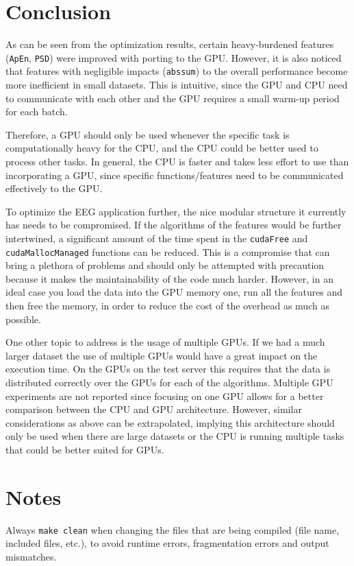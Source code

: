 \documentclass[a4paper]{article}
\begin{document}
\section{Conclusion}

As can be seen from the optimization results, certain heavy-burdened features (\texttt{ApEn}, \texttt{PSD}) were improved with porting to the GPU. However, it is also noticed that features with negligible impacts (\texttt{abssum}) to the overall performance become more inefficient in small datasets. This is intuitive, since the GPU and CPU need to communicate with each other and the GPU requires a small warm-up period for each batch. 

Therefore, a GPU should only be used whenever the specific task is computationally heavy for the CPU, and the CPU could be better used to process other tasks. In general, the CPU is faster and takes less effort to use than incorporating a GPU, since specific functions/features need to be communicated effectively to the GPU.

To optimize the EEG application further, the nice modular structure it currently has needs to be compromised. If the algorithms of the features would be further intertwined, a significant amount of the time spent in the \texttt{cudaFree} and \texttt{cudaMallocManaged} functions can be reduced. This is a compromise that can bring a plethora of problems and should only be attempted with precaution because it makes the maintainability of the code much harder. However, in an ideal case you load the data into the GPU memory one, run all the features and then free the memory, in order to reduce the cost of the overhead as much as possible.

One other topic to address is the usage of multiple GPUs. If we had a much larger dataset the use of multiple GPUs would have a great impact on the execution time. On the GPUs on the test server this requires that the data is distributed correctly over the GPUs for each of the algorithms. Multiple GPU experiments are not reported since focusing on one GPU allows for a better comparison between the CPU and GPU architecture. However, similar considerations as above can be extrapolated, implying this architecture should only be used when there are large datasets or the CPU is running multiple tasks that could be better suited for GPUs.

\section{Notes}
Always \texttt{make clean} when changing the files that are being compiled (file name, included files, etc.), to avoid runtime errors, fragmentation errors and output mismatches.
\end{document}

